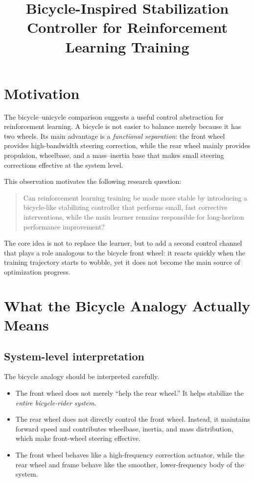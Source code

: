 \documentclass[11pt]{article}
\title{Bicycle-Inspired Stabilization Controller for Reinforcement Learning Training}
\author{}
\date{}
\begin{document}
\maketitle

\section{Motivation}

The bicycle--unicycle comparison suggests a useful control abstraction for reinforcement learning. A bicycle is not easier to balance merely because it has two wheels. Its main advantage is a \emph{functional separation}: the front wheel provides high-bandwidth steering correction, while the rear wheel mainly provides propulsion, wheelbase, and a mass--inertia base that makes small steering corrections effective at the system level.

This observation motivates the following research question:
\begin{quote}
Can reinforcement learning training be made more stable by introducing a bicycle-like stabilizing controller that performs small, fast corrective interventions, while the main learner remains responsible for long-horizon performance improvement?
\end{quote}

The core idea is not to replace the learner, but to add a second control channel that plays a role analogous to the bicycle front wheel: it reacts quickly when the training trajectory starts to wobble, yet it does not become the main source of optimization progress.

\section{What the Bicycle Analogy Actually Means}

\subsection{System-level interpretation}

The bicycle analogy should be interpreted carefully.

\begin{itemize}[leftmargin=1.5em]
    \item The front wheel does not merely ``help the rear wheel.'' It helps stabilize the \emph{entire bicycle-rider system}.
    \item The rear wheel does not directly control the front wheel. Instead, it maintains forward speed and contributes wheelbase, inertia, and mass distribution, which make front-wheel steering effective.
    \item The front wheel behaves like a high-frequency correction actuator, while the rear wheel and frame behave like the smoother, lower-frequency body of the system.
\end{itemize}
\end{document}
